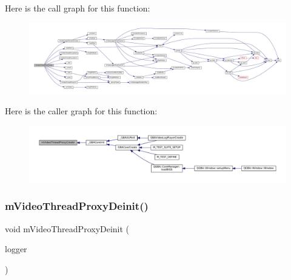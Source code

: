 Here is the call graph for this function\+:
\nopagebreak
\begin{figure}[H]
\begin{center}
\leavevmode
\includegraphics[width=350pt]{thread-proxy_8c_a8c023e44feda4222c0441d7bb694f546_cgraph}
\end{center}
\end{figure}
Here is the caller graph for this function\+:
\nopagebreak
\begin{figure}[H]
\begin{center}
\leavevmode
\includegraphics[width=350pt]{thread-proxy_8c_a8c023e44feda4222c0441d7bb694f546_icgraph}
\end{center}
\end{figure}
\mbox{\label{thread-proxy_8c_a7d6faab8646db46852a09b83af7216e0}} 
\subsubsection{\texorpdfstring{m\+Video\+Thread\+Proxy\+Deinit()}{mVideoThreadProxyDeinit()}}
{\footnotesize\ttfamily void m\+Video\+Thread\+Proxy\+Deinit (\begin{DoxyParamCaption}\item[{struct m\+Video\+Logger $\ast$}]{logger }\end{DoxyParamCaption})\hspace{0.3cm}{\ttfamily [static]}}

